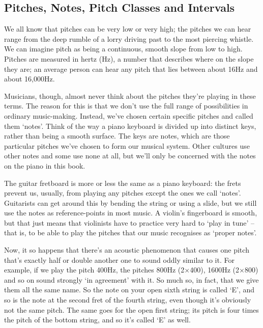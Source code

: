\documentclass[english]{./gbook}
\begin{document}
\begin{large}
\section*{Pitches, Notes, Pitch Classes and Intervals}

We all know that pitches can be very low or very high; the pitches we can hear range from the deep rumble of a lorry driving past to the most piercing whistle. We can imagine pitch as being a continuous, smooth slope from low to high. Pitches are measured in hertz (Hz), a number that describes where on the slope they are; an average person can hear any pitch that lies between about 16Hz and about 16,000Hz.

Musicians, though, almost never think about the pitches they're playing in these terms. The reason for this is that we don't use the full range of possibilities in ordinary music-making. Instead, we've chosen certain specific pitches and called them `notes'. Think of the way a piano keyboard is divided up into distinct keys, rather than being a smooth surface. The keys are notes, which are those particular pitches we've chosen to form our musical system. Other cultures use other notes and some use none at all, but we'll only be concerned with the notes on the piano in this book.

The guitar fretboard is more or less the same as a piano keyboard: the frets prevent us, usually, from playing any pitches except the ones we call `notes'. Guitarists can get around this by bending the string or using a slide, but we still use the notes as reference-points in most music. A violin's fingerboard is smooth, but that just means that violinists have to practice very hard to `play in tune' -- that is, to be able to play the pitches that our music recognises as `proper notes'.

Now, it so happens that there's an acoustic phenomenon that causes one pitch that's exactly half or double another one to sound oddly similar to it. For example, if we play the pitch 400Hz, the pitches 800Hz (2$\times$400), 1600Hz (2$\times$800) and so on sound strongly `in agreement' with it. So much so, in fact, that we give them all the same name. So the note on your open sixth string is called `E', and so is the note at the second fret of the fourth string, even though it's obviously not the same pitch. The same goes for the open first string; its pitch is four times the pitch of the bottom string, and so it's called `E' as well.


\end{large}
\end{document}

